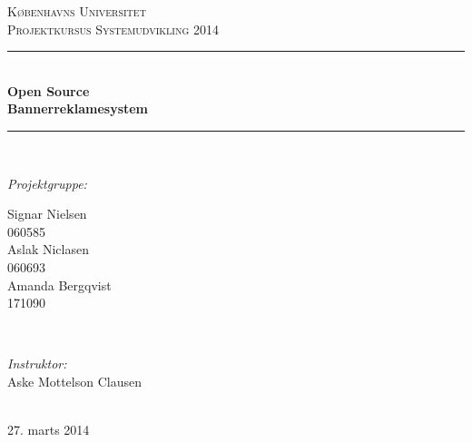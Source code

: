 \documentclass[a4paper,12pt]{article}
\begin{document}
\begin{titlepage}


\newcommand{\HRule}{\rule{\linewidth}{0.5mm}} %

\center %

\textsc{\LARGE Københavns Universitet}\\[1.5cm] %
\textsc{\Large Projektkursus Systemudvikling 2014}\\[0.5cm] %

\HRule \\[0.4cm]
{  \bfseries \large Open Source \\ \huge Bannerreklamesystem}\\[0.4cm] %
\HRule \\[1.5cm]

\begin{minipage}[t]{0.4\textwidth}
\begin{flushleft} \large
\emph{Projektgruppe:}


Signar Nielsen %
\\
060585
\newline
\\
Aslak Niclasen
\\
060693
\newline
\\
Amanda Bergqvist
\\
171090
\end{flushleft}
\end{minipage}
~
\begin{minipage}[t]{0.4\textwidth}
\begin{flushright} \large
\emph{Instruktor:} \\
Aske Mottelson Clausen %
\end{flushright}
\end{minipage}\\[4cm]

{\large 27. marts 2014}\\[3cm] %

\end{titlepage}

\tableofcontents %


\clearpage %
\end{document}
